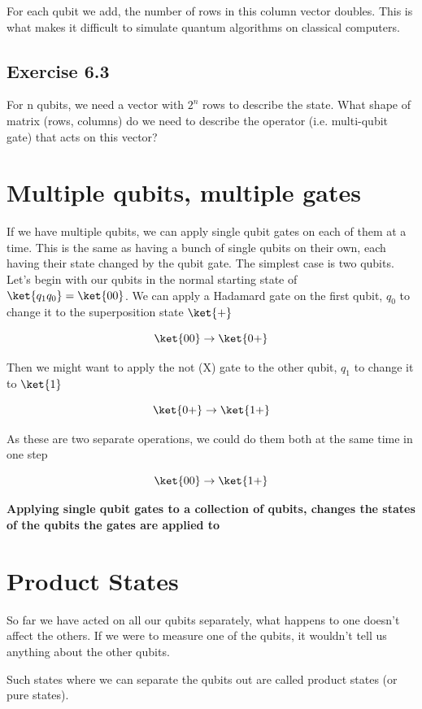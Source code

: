 \documentclass{book}
\begin{document}
For each qubit we add, the number of rows in this column vector doubles. This is what makes it difficult to simulate quantum algorithms on classical computers. 



\subsection{Exercise 6.3}

For n qubits, we need a vector with $2^n$ rows to describe the state. What shape of matrix (rows, columns) do we need to describe the operator (i.e. multi-qubit gate) that acts on this vector? 

\section{ Multiple qubits, multiple gates }


If we have multiple qubits, we can apply single qubit gates on each of them at a time. This is the same as having a bunch of single qubits on their own, each having their state changed by the qubit gate. The simplest case is two qubits. Let's begin with our qubits in the normal starting state of $\ket{q_1q_0} = \ket{00}$. We can apply a Hadamard gate on the first qubit, $q_0$ to change it to the superposition state $\ket{+}$

$$ \ket{00} \rightarrow \ket{0+} $$ 

Then we might want to apply the not (X) gate to the other qubit, $q_1$ to change it to $\ket{1}$

$$ \ket{0+} \rightarrow \ket{1+} $$

As these are two separate operations, we could do them both at the same time in one step 

$$  \ket{00} \rightarrow \ket{1+} $$

\textbf{Applying single qubit gates to a collection of qubits, changes the states of the qubits the gates are applied to}


\section{ Product States }

So far we have acted on all our qubits separately, what happens to one doesn't affect the others. If we were to measure one of the qubits, it wouldn't tell us anything about the other qubits. 

Such states where we can separate the qubits out are called product states (or pure states). 
\end{document}
